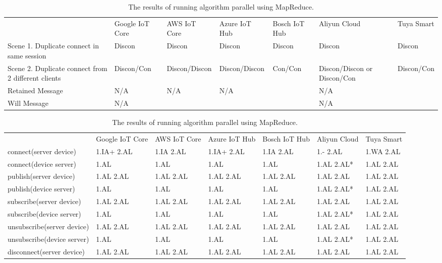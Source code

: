 
\begin{table}[a]
    \caption{\newline The results of running algorithm parallel using MapReduce.}
    \begin{tabular}{lllllll}
    \hline
     & Google IoT Core & AWS IoT Core & Azure IoT Hub & Bosch IoT Hub & Aliyun Cloud & Tuya Smart \\
    Scene 1. Duplicate connect in same session & Discon & Discon & Discon & Discon & Discon & Discon \\
    Scene 2. Duplicate connect from 2 different clients & Discon/Con & Discon/Discon & Discon/Discon & Con/Con & Discon/Discon or Discon/Con & Discon/Con \\
    Retained Message & N/A & N/A & N/A &  & N/A &  \\
    Will Message & N/A &  &  &  & N/A &          
    \end{tabular}
    \end{table}
    
    
    \begin{table}[a]
    \caption{\newline The results of running algorithm parallel using MapReduce.}
    \begin{tabular}{lllllll}
    \hline
    ​ & Google IoT Core & AWS IoT Core & Azure IoT Hub & Bosch IoT Hub & Aliyun Cloud & Tuya Smart \\
    connect(server device) & 1.IA+ 2.AL & 1.IA 2.AL & 1.IA+ 2.AL & 1.IA 2.AL & 1.- 2.AL & 1.WA 2.AL \\
    connect(device server) & 1.AL & 1.AL & 1.AL & 1.AL & 1.AL 2.AL* & 1.AL 2.AL \\
    publish(server device) & 1.AL 2.AL & 1.AL 2.AL & 1.AL 2.AL & 1.AL 2.AL & 1.AL 2.AL & 1.AL 2.AL \\
    publish(device server) & 1.AL & 1.AL & 1.AL & 1.AL & 1.AL 2.AL* & 1.AL 2.AL \\
    subscribe(server device) & 1.AL 2.AL & 1.AL 2.AL & 1.AL 2.AL & 1.AL 2.AL & 1.AL 2.AL & 1.AL 2.AL \\
    subscribe(device server) & 1.AL & 1.AL & 1.AL & 1.AL & 1.AL 2.AL* & 1.AL 2.AL \\
    unsubscribe(server device) & 1.AL 2.AL & 1.AL 2.AL & 1.AL 2.AL & 1.AL 2.AL & 1.AL 2.AL & 1.AL 2.AL \\
    unsubscribe(device server) & 1.AL & 1.AL & 1.AL & 1.AL & 1.AL 2.AL* & 1.AL 2.AL \\
    disconnect(server device) & 1.AL 2.AL & 1.AL 2.AL & 1.AL 2.AL & 1.AL 2.AL & 1.AL 2.AL & 1.AL 2.AL \\
    \end{tabular}
    \end{table}    